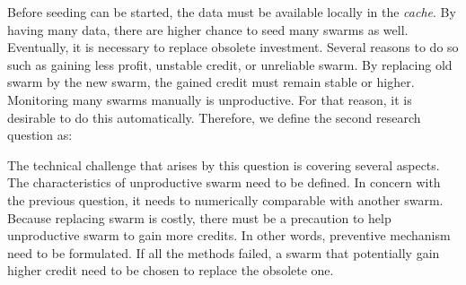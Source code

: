 
Before seeding can be started, the data must be available locally in the \textit{cache}. By having many data, there are higher chance to seed many swarms as well. Eventually, it is necessary to replace obsolete investment. Several reasons to do so such as gaining less profit, unstable credit, or unreliable swarm. By replacing old swarm by the new swarm, the gained credit must remain stable or higher. Monitoring many swarms manually is unproductive. For that reason, it is desirable to do this automatically. Therefore, we define the second research question as: 

	
The technical challenge that arises by this question is covering several aspects. The characteristics of unproductive swarm need to be defined. In concern with the previous question, it needs to numerically comparable with another swarm. Because replacing swarm is costly, there must be a precaution to help unproductive swarm to gain more credits. In other words, preventive mechanism need to be formulated. If all the methods failed, a swarm that potentially gain higher credit need to be chosen to replace the obsolete one. 